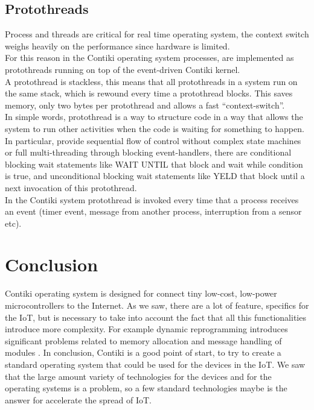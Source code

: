 \documentclass[a4paper,10pt]{article}
\begin{document}
\begin{multicols}{2}
\subsection{Protothreads}

Process and threads are critical for real time operating system, the context switch weighs heavily on the performance since hardware is limited.
\\For this reason in the Contiki operating system processes, are implemented as protothreads running on top of the event-driven Contiki kernel.\\
A protothread is stackless, this means that all protothreads in a system run on the same stack, which is rewound every time a protothread blocks. This saves memory, only two bytes per protothread and allows a fast “context-switch”.\\
In simple words,  protothread is a way to structure code in a way that allows the system to run other activities when the code is waiting for something to happen.
In particular, provide sequential flow of control without complex state machines or full multi-threading through blocking event-handlers, there are conditional blocking wait statements like WAIT UNTIL that block and wait while condition is true, and unconditional blocking wait statements like YELD that block until a next invocation of this protothread.
\\In the Contiki system protothread is invoked every time that a process receives an event (timer event, message from another process, interruption from a sensor etc).

\section{Conclusion}

Contiki operating system is designed for connect tiny low-cost, low-power microcontrollers
 to the Internet. As we saw, there are a lot of feature, specifics for the IoT, but is necessary
 to take into account the fact that all this functionalities introduce more complexity. For
 example dynamic reprogramming introduces significant problems related to memory allocation
 and message handling of modules \cite{os09}.
In conclusion, Contiki is a good point of start, to try to create a standard operating system that could be used for the devices in the IoT. We saw that the large amount variety of technologies for the devices and for the operating systems is a problem, so a few standard technologies maybe is the answer for accelerate the spread of IoT.







\end{multicols}
\end{document}
